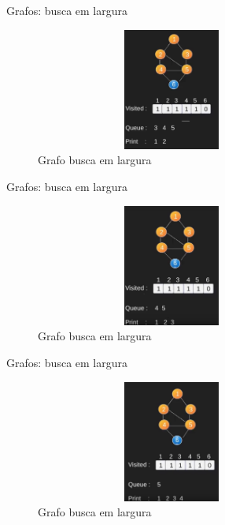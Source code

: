 \begin{frame}
	\begin{block}{Grafos: busca em largura}
		\begin{figure}[!htb]
			\centering	  
			\includegraphics[height=4cm, width = 9cm]{./pic/bfs6.png}
			\caption{Grafo busca em largura \cite{GEEKS_2018}}
		\end{figure}
	\end{block}
\end{frame}

\begin{frame}
	\begin{block}{Grafos: busca em largura}
		\begin{figure}[!htb]
			\centering	  
			\includegraphics[height=4cm, width = 9cm]{./pic/bfs7.png}
			\caption{Grafo busca em largura \cite{GEEKS_2018}}
		\end{figure}
	\end{block}
\end{frame}

\begin{frame}
	\begin{block}{Grafos: busca em largura}
		\begin{figure}[!htb]
			\centering	  
			\includegraphics[height=4cm, width = 9cm]{./pic/bfs8.png}
			\caption{Grafo busca em largura \cite{GEEKS_2018}}
		\end{figure}
	\end{block}
\end{frame}

